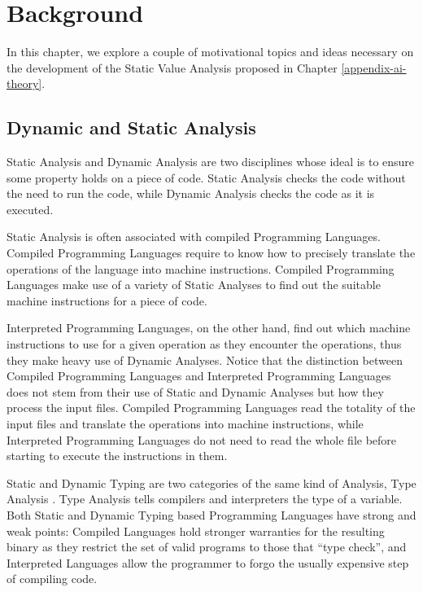 \chapter{Background}\label{background}

In this chapter, we explore a couple of motivational topics and ideas
necessary on the development of the Static Value Analysis proposed in
Chapter \ref{appendix-ai-theory}.

\section{Dynamic and Static Analysis}%
\label{dynamic-and-static-analysis}

Static Analysis and Dynamic Analysis are two
disciplines%
whose ideal is to ensure some property
holds on a piece of code. Static Analysis checks the code without the
need to run the code, while Dynamic Analysis checks the code as it is
executed.

Static Analysis is often associated with compiled Programming Languages.
Compiled Programming Languages require to know how to precisely
translate the operations of the language into machine instructions.
Compiled Programming Languages make use of a variety of Static Analyses
to find out the suitable machine instructions for a piece of code.

Interpreted Programming Languages, on the other hand, find out which
machine instructions to use for a given operation as they encounter the
operations, thus they make heavy use of Dynamic Analyses. Notice that
the distinction between Compiled Programming Languages and Interpreted
Programming Languages does not stem from their use of Static and Dynamic
Analyses but how they process the input files. Compiled Programming
Languages read the totality of the input files and translate the
operations into machine instructions, while Interpreted Programming
Languages do not need to read the whole file before starting to execute
the instructions in them.

Static and Dynamic Typing are two categories of the same kind of
Analysis, Type Analysis \autocite{pierce_types_2002}. Type Analysis
tells compilers and interpreters the type of a variable. Both Static and
Dynamic Typing based Programming Languages have strong and weak points:
Compiled Languages hold stronger warranties for the resulting binary as
they restrict the set of valid programs to those that \enquote{type
check}, and Interpreted Languages allow the programmer to forgo the
usually expensive step of compiling code.

